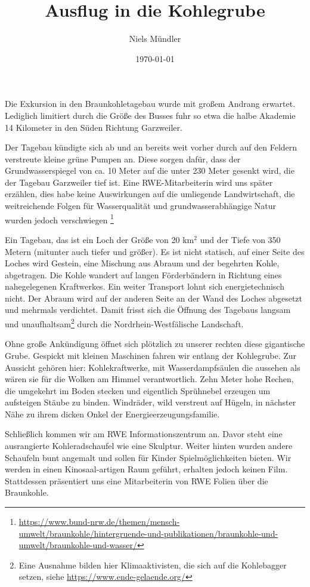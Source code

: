 \documentclass{article}
\title{Ausflug in die Kohlegrube}
\author{Niels Mündler}
\date{\today}
\begin{document}
\maketitle

Die Exkursion in den Braunkohletagebau wurde mit großem Andrang erwartet.
Lediglich limitiert durch die Größe des Busses fuhr so etwa die halbe Akademie 14 Kilometer in den Süden Richtung Garzweiler.

Der Tagebau kündigte sich ab und an bereits weit vorher durch auf den Feldern verstreute kleine grüne Pumpen an.
Diese sorgen dafür, dass der Grundwasserspiegel von ca. 10 Meter auf die unter 230 Meter gesenkt wird, die der Tagebau Garzweiler tief ist.
Eine RWE-Mitarbeiterin wird uns später erzählen, dies habe keine Auswirkungen auf die umliegende Landwirtschaft, die weitreichende Folgen für Wasserqualität und grundwasserabhängige Natur wurden jedoch verschwiegen
\footnote{\url{https://www.bund-nrw.de/themen/mensch-umwelt/braunkohle/hintergruende-und-publikationen/braunkohle-und-umwelt/braunkohle-und-wasser/}}

Ein Tagebau, das ist ein Loch der Größe von 20 km$^2$ und der Tiefe von 350 Metern (mitunter auch tiefer und größer).
Es ist nicht statisch, auf einer Seite des Loches wird Gestein, eine Mischung aus Abraum und der begehrten Kohle,
abgetragen. Die Kohle wandert auf langen Förderbändern in Richtung eines nahegelegenen Kraftwerkes.
Ein weiter Transport lohnt sich energietechnisch nicht.
Der Abraum wird auf der anderen Seite an der Wand des Loches abgesetzt und mehrmals verdichtet.
Damit frisst sich die Öffnung des Tagebaus langsam und unaufhaltsam\footnote{
    Eine Ausnahme bilden hier Klimaaktivisten, die sich auf die Kohlebagger setzen, siehe \url{https://www.ende-gelaende.org/}
} durch die Nordrhein-Westfälische Landschaft.

Ohne große Ankündigung öffnet sich plötzlich zu unserer rechten diese gigantische Grube.
Gespickt mit kleinen Maschinen fahren wir entlang der Kohlegrube.
Zur Aussicht gehören hier: Kohlekraftwerke, mit Wasserdampfsäulen die aussehen als wären sie für die Wolken am Himmel verantwortlich.
Zehn Meter hohe Rechen, die umgekehrt im Boden stecken und eigentlich Sprühnebel erzeugen um aufsteigen Stäube zu binden.
Windräder, wild verstreut auf Hügeln, in nächster Nähe zu ihrem dicken Onkel der Energieerzeugungsfamilie.

Schließlich kommen wir am RWE Informationszentrum an.
Davor steht eine ausrangierte Kohleradschaufel wie eine Skulptur.
Weiter hinten wurden andere Schaufeln bunt angemalt und sollen für Kinder Spielmöglichkeiten bieten.
Wir werden in einen Kinosaal-artigen Raum geführt, erhalten jedoch keinen Film.
Stattdessen präsentiert uns eine Mitarbeiterin von RWE Folien über die Braunkohle.
\end{document}
